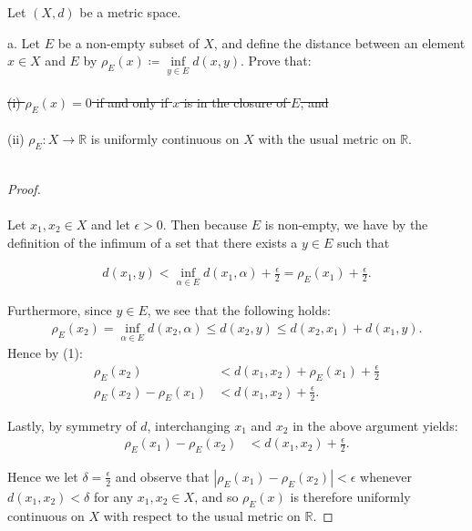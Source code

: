 Let $(X, d)$ be a metric space.

a.  Let $E$ be a non-empty subset of $X$, and define the distance between an
    element $x \in X$ and $E$ by
    $\rho_E(x) \coloneqq \inf\limits_{y \in E}{d(x, y)}$.  Prove that: \ \\\\
    \sout{(i) $\rho_E(x) = 0$ if and only if $x$ is in the closure of $E$, and} \ \\\\
    (ii) $\rho_E:X \to \mathbb{R}$ is uniformly continuous on $X$ with the usual metric on $\mathbb{R}$.\ \\\\

    \begin{proof}\ \\\\
        Let $x_1, x_2 \in X$ and let $\epsilon > 0$. Then because $E$ is non-empty, we have by the definition of the infimum
        of a set that there exists a $y \in E$ such that

        \begin{align}
            d(x_1, y) < \inf\limits_{\alpha \in E}{d(x_1, \alpha)} + \frac{\epsilon}{2} = \rho_E(x_1) + \frac{\epsilon}{2}.
        \end{align}
        
        Furthermore, since $y \in E$, we see that the following holds:
        \begin{align*}
            \rho_E(x_2) = \inf\limits_{\alpha \in E}{d(x_2, \alpha)} \le d(x_2, y) \le d(x_2, x_1) + d(x_1, y).
        \end{align*}
        Hence by (1):
        \begin{align*}
                          \rho_E(x_2) &< d(x_1, x_2) + \rho_E(x_1) + \frac{\epsilon}{2} \\
            \rho_E(x_2) - \rho_E(x_1) &< d(x_1, x_2) + \frac{\epsilon}{2}.
        \end{align*}

        Lastly, by symmetry of $d$, interchanging $x_1$ and $x_2$ in the above argument yields:
        \begin{align*}
            \rho_E(x_1) - \rho_E(x_2) &< d(x_1, x_2) + \frac{\epsilon}{2}.
        \end{align*}

        Hence we let $\delta = \frac{\epsilon}{2}$ and observe that $|\rho_E(x_1) - \rho_E(x_2)| < \epsilon$ whenever
         $d(x_1, x_2) < \delta$ for any $x_1, x_2 \in X$, and so $\rho_E(x)$ is therefore uniformly continuous on $X$ 
         with respect to the usual metric on $\mathbb{R}$.


    \end{proof}

